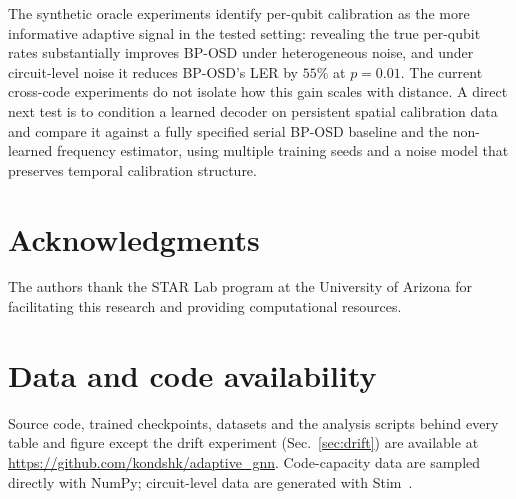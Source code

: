 \documentclass[a4paper,twocolumn,11pt,nopdfoutputerror]{quantumarticle}
\begin{document}
The synthetic oracle experiments identify per-qubit calibration as the
more informative adaptive signal in the tested setting: revealing the
true per-qubit rates substantially improves BP-OSD under heterogeneous
noise, and under circuit-level noise it reduces BP-OSD's LER by $55\%$ at
$p=0.01$. The current cross-code experiments do not
isolate how this gain scales with distance. A direct next test is to condition a
learned decoder on persistent spatial calibration data and compare it
against a fully specified serial BP-OSD baseline and the non-learned
frequency estimator, using multiple training seeds and a noise model that
preserves temporal calibration structure.
\section*{Acknowledgments}

The authors thank the STAR Lab program at the University of Arizona
for facilitating this research and providing computational resources.

\section*{Data and code availability}

Source code, trained checkpoints, datasets and the analysis scripts
behind every table and figure except the drift experiment
(Sec.~\ref{sec:drift}) are available at
\url{https://github.com/kondshk/adaptive_gnn}. Code-capacity data are
sampled directly with NumPy; circuit-level data are generated with
Stim~\cite{Gidney2021Stim}.



\end{document}
